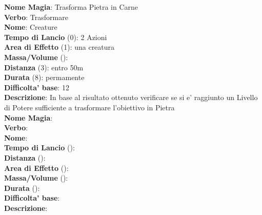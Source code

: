 \flushleft \textbf{Nome Magia}: Trasforma Pietra in Carne \\ 
\textbf{Verbo}: Trasformare\\
\textbf{Nome}: Creature\\
\textbf{Tempo di Lancio} (0): 2 Azioni\\
\textbf{Area di Effetto} (1): una creatura\\
\textbf{Massa/Volume} (): \\
\textbf{Distanza} (3): entro 50m\\
\textbf{Durata} (8): permamente\\
\textbf{Difficolta' base}: 12 \\
\textbf{Descrizione}: In base al risultato ottenuto verificare se si e' raggiunto un Livello di Potere sufficiente a trasformare l'obiettivo in Pietra\\


\flushleft \textbf{Nome Magia}: \\ 
\textbf{Verbo}: \\
\textbf{Nome}: \\
\textbf{Tempo di Lancio} (): \\
\textbf{Distanza} (): \\
\textbf{Area di Effetto} (): \\
\textbf{Massa/Volume} (): \\
\textbf{Durata} (): \\
\textbf{Difficolta' base}: \\
\textbf{Descrizione}: \\
